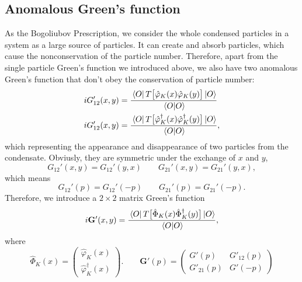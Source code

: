 \documentclass[12pt]{article}
\begin{document}
\subsection*{Anomalous Green's function}
As the Bogoliubov Prescription, we consider the whole condensed particles in a system 
as a large source of particles. It can create and absorb particles, which cause the 
nonconservation of the particle number. Therefore, apart from the single particle 
Green's function we introduced above, we also have two anomalous Green's function 
that don't obey the conservation of particle number:
\begin{subequations}
    \begin{align}
        &iG'_{12}(x,y)=\frac{\bra*{O}T\big[\hat{\varphi}_K(x)\hat{\varphi}_K(y)\big]
        \ket*{O}}{\braket*{O}{O}}\label{Za}\\
        &iG'_{12}(x,y)=\frac{\bra*{O}T\big[\hat{\varphi}^\dagger_K(x)\hat{\varphi}^\dagger_K(y)
        \big]\ket*{O}}{\braket*{O}{O}}\label{Zb},
    \end{align}
\end{subequations}
which representing the appearance and disappearance of two particles from the 
condensate. Obviusly, they are symmetric under the exchange of $x$ and $y$, 
\begin{equation}
    G_{12}'(x,y)=G_{12}'(y,x) \qquad G_{21}'(x,y)=G_{21}'(y,x),
\end{equation}
which means 
\begin{equation}
    G_{12}'(p)=G_{12}'(-p) \qquad G_{21}'(p)=G_{21}'(-p).
\end{equation}
Therefore, we introduce a $2\times 2$ matrix Green's function 
\begin{equation}
    i\mathbf{G}'(x,y)=\frac{\bra*{O}T\big[\hat{\Phi}_K(x)\hat{\Phi}_K^\dagger(y)\big]
        \ket*{O}}{\braket*{O}{O}},
\end{equation}
where 
\begin{equation}
    \hat{\Phi}_K(x)=\left(\begin{matrix}
        \hat{\varphi}_K(x)\\
        \hat{\varphi}^\dagger_K(x)
    \end{matrix}\right).\qquad
    \mathbf{G}'(p)=\left(\begin{matrix}
        G'(p) &G'_{12}(p)\\
        G'_{21}(p) &G'(-p)
    \end{matrix}\right)
\end{equation}
\end{document}
